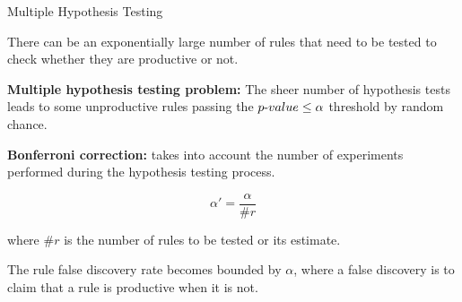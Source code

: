 
\begin{frame}{Multiple Hypothesis Testing}

There can be an exponentially large number of rules that need to
be tested to check whether they are productive or not. 

\medskip


\textbf{Multiple hypothesis testing problem:} The sheer number
of hypothesis tests leads to some unproductive rules passing the ${p\text{-}value} \le
\alpha$ threshold by random chance.

\medskip


\textbf{Bonferroni correction:} takes into account the number of experiments
performed during the hypothesis testing process.

\medskip

$$\alpha' = \frac{\alpha}{\#r}$$

where $\#r$ is the number of rules to be tested or its estimate.

\medskip

The rule false discovery rate becomes bounded by $\alpha$, where a false discovery is to claim that a rule
is productive when it is not.
\end{frame}

